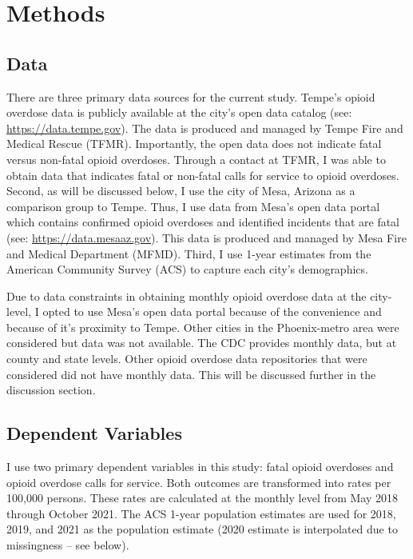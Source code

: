 \section{\centering Methods}
\subsection{Data}
There are three primary data sources for the current study. Tempe's opioid overdose data is publicly available at the city's open data catalog (see: \href{https://data.tempe.gov/datasets/2daeeafd2741494c8294ca415e5a793e_0/explore?location=33.398962%2C-111.931850%2C11.93}{https://data.tempe.gov}). The data is produced and managed by Tempe Fire and Medical Rescue (TFMR). Importantly, the open data does not indicate fatal versus non-fatal opioid overdoses. Through a contact at TFMR, I was able to obtain data that indicates fatal or non-fatal calls for service to opioid overdoses. 
Second, as will be discussed below, I use the city of Mesa, Arizona as a comparison group to Tempe. Thus, I use data from Mesa's open data portal which contains confirmed opioid overdoses and identified incidents that are fatal (see: \href{https://data.mesaaz.gov/Fire-and-Medical/Fire-and-Medical-Opioid-Overdose-Incidents/qufy-tzv6/about_data}{https://data.mesaaz.gov}). This data is produced and managed by Mesa Fire and Medical Department (MFMD). Third, I use 1-year estimates from the American Community Survey (ACS) to capture each city's demographics.

Due to data constraints in obtaining monthly opioid overdose data at the city-level, I opted to use Mesa's open data portal because of the convenience and because of it's proximity to Tempe. Other cities in the Phoenix-metro area were considered but data was not available. The CDC provides monthly data, but at county and state levels. Other opioid overdose data repositories that were considered did not have monthly data. This will be discussed further in the discussion section.

\subsection{Dependent Variables}
I use two primary dependent variables in this study: fatal opioid overdoses and opioid overdose calls for service. Both outcomes are transformed into rates per 100,000 persons. These rates are calculated at the monthly level from May 2018 through October 2021. The ACS 1-year population estimates are used for 2018, 2019, and 2021 as the population estimate (2020 estimate is interpolated due to missingness -- see below).

